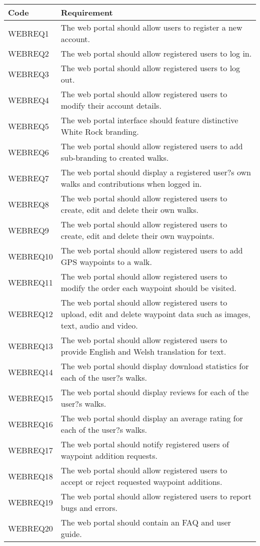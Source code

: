 \documentclass[11pt,a4paper]{article}
\begin{document}
\begin{longtable}{|p{2.5cm}p{13cm}|}
\hline
\textbf{Code} & \textbf{Requirement} \\
\hline
WEBREQ1 & The web portal should allow users to register a new account. \\ \hline
WEBREQ2 & The web portal should allow registered users to log in. \\ \hline
WEBREQ3 & The web portal should allow registered users to log out. \\ \hline
WEBREQ4 & The web portal should allow registered users to modify their account details. \\ \hline
WEBREQ5 & The web portal interface should feature distinctive White Rock branding. \\ \hline
WEBREQ6 & The web portal should allow registered users to add sub-branding to created walks. \\ \hline
WEBREQ7 & The web portal should display a registered user?s own walks and contributions when logged in. \\ \hline
WEBREQ8 & The web portal should allow registered users to create, edit and delete their own walks. \\ \hline
WEBREQ9 & The web portal should allow registered users to create, edit and delete their own waypoints. \\ \hline
WEBREQ10 & The web portal should allow registered users to add GPS waypoints to a walk. \\ \hline
WEBREQ11 & The web portal should allow registered users to modify the order each waypoint should be visited. \\ \hline
WEBREQ12 & The web portal should allow registered users to upload, edit and delete waypoint data such as images, text, audio and video. \\ \hline
WEBREQ13 & The web portal should allow registered users to provide English and Welsh translation for text. \\ \hline
WEBREQ14 & The web portal should display download statistics for each of the user?s walks. \\ \hline
WEBREQ15 & The web portal should display reviews for each of the user?s walks. \\ \hline
WEBREQ16 & The web portal should display an average rating for each of the user?s walks. \\ \hline
WEBREQ17 & The web portal should notify registered users of waypoint addition requests. \\ \hline
WEBREQ18 & The web portal should allow registered users to accept or reject requested waypoint additions. \\ \hline
WEBREQ19 & The web portal should allow registered users to report bugs and errors. \\ \hline
WEBREQ20 & The web portal should contain an FAQ and user guide. \\ \hline

\end{longtable}
\end{document}
